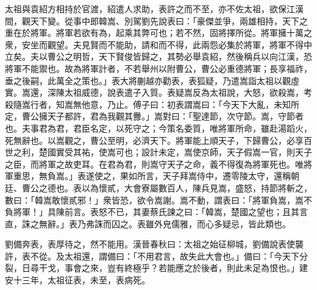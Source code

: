 \begin{pinyinscope}
太祖與袁紹方相持於官渡，紹遣人求助，表許之而不至，亦不佐太祖，欲保江漢間，觀天下變。從事中郎韓嵩、別駕劉先說表曰：「豪傑並爭，兩雄相持，天下之重在於將軍。將軍若欲有為，起乘其弊可也；若不然，固將擇所從。將軍擁十萬之衆，安坐而觀望。夫見賢而不能助，請和而不得，此兩怨必集於將軍，將軍不得中立矣。夫以曹公之明哲，天下賢俊皆歸之，其勢必舉袁紹，然後稱兵以向江漢，恐將軍不能禦也。故為將軍計者，不若舉州以附曹公，曹公必重德將軍；長享福祚，垂之後嗣，此萬全之策也。」表大將蒯越亦勸表，表狐疑，乃遣嵩詣太祖以觀虛實。嵩還，深陳太祖威德，說表遣子入質。表疑嵩反為太祖說，大怒，欲殺嵩，考殺隨嵩行者，知嵩無他意，乃止。傅子曰：初表謂嵩曰：「今天下大亂，未知所定，曹公擁天子都許，君為我觀其釁。」嵩對曰：「聖達節，次守節。嵩，守節者也。夫事君為君，君臣名定，以死守之；今策名委質，唯將軍所命，雖赴湯蹈火，死無辭也。以嵩觀之，曹公至明，必濟天下。將軍能上順天子，下歸曹公，必享百世之利，楚國實受其祐，使嵩可也；設計未定，嵩使京師，天子假嵩一官，則天子之臣，而將軍之故吏耳。在君為君，則嵩守天子之命，義不得復為將軍死也。唯將軍重思，無負嵩。」表遂使之，果如所言，天子拜嵩侍中，遷零陵太守，還稱朝廷、曹公之德也。表以為懷貳，大會寮屬數百人，陳兵見嵩，盛怒，持節將斬之，數曰：「韓嵩敢懷貳邪！」衆皆恐，欲令嵩謝。嵩不動，謂表曰：「將軍負嵩，嵩不負將軍！」具陳前言。表怒不已，其妻蔡氏諫之曰：「韓嵩，楚國之望也；且其言直，誅之無辭。」表乃弗誅而囚之。表雖外皃儒雅，而心多疑忌，皆此類也。

劉備奔表，表厚待之，然不能用。漢晉春秋曰：太祖之始征柳城，劉備說表使襲許，表不從。及太祖還，謂備曰：「不用君言，故失此大會也。」備曰：「今天下分裂，日尋干戈，事會之來，豈有終極乎？若能應之於後者，則此未足為恨也。」建安十三年，太祖征表，未至，表病死。


\end{pinyinscope}
